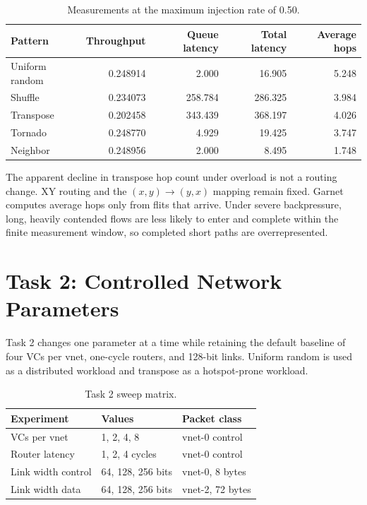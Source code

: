 \documentclass[11pt,a4paper]{article}
\begin{document}
\begin{table}[H]
\centering
\caption{Measurements at the maximum injection rate of 0.50.}
\begin{tabular}{lrrrr}
\toprule
Pattern & Throughput & Queue latency & Total latency & Average hops \\
\midrule
Uniform random & 0.248914 & 2.000 & 16.905 & 5.248 \\
Shuffle & 0.234073 & 258.784 & 286.325 & 3.984 \\
Transpose & 0.202458 & 343.439 & 368.197 & 4.026 \\
Tornado & 0.248770 & 4.929 & 19.425 & 3.747 \\
Neighbor & 0.248956 & 2.000 & 8.495 & 1.748 \\
\bottomrule
\end{tabular}
\end{table}

The apparent decline in transpose hop count under overload is not a routing
change. XY routing and the $(x,y)\rightarrow(y,x)$ mapping remain fixed. Garnet
computes average hops only from flits that arrive. Under severe backpressure,
long, heavily contended flows are less likely to enter and complete within the
finite measurement window, so completed short paths are overrepresented.

\section{Task 2: Controlled Network Parameters}

Task 2 changes one parameter at a time while retaining the default baseline of
four VCs per vnet, one-cycle routers, and 128-bit links. Uniform random is used
as a distributed workload and transpose as a hotspot-prone workload.

\begin{table}[H]
\centering
\caption{Task 2 sweep matrix.}
\begin{tabular}{lll}
\toprule
Experiment & Values & Packet class \\
\midrule
VCs per vnet & 1, 2, 4, 8 & vnet-0 control \\
Router latency & 1, 2, 4 cycles & vnet-0 control \\
Link width control & 64, 128, 256 bits & vnet-0, 8 bytes \\
Link width data & 64, 128, 256 bits & vnet-2, 72 bytes \\
\bottomrule
\end{tabular}
\end{table}
\end{document}
